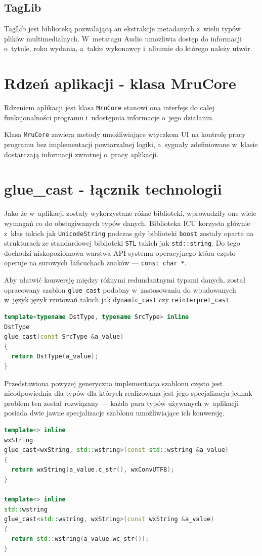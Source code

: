 \subsection{TagLib}
TagLib jest biblioteką pozwalającą an ekstrakcje metadanych z~wielu typów plików multimedialnych. W~metatagu Audio umożliwia dostęp do informacji o~tytule, roku wydania, a~także wykonawcy i~albumie do którego należy utwór.

\section{Rdzeń aplikacji - klasa MruCore}
Rdzeniem aplikacji jest klasa \texttt{MruCore} stanowi ona interfejs do całej funkcjonalności programu i~udostępnia informacje o~jego działaniu.
\par
Klasa \texttt{MruCore} zawiera metody umożliwiające wtyczkom UI na kontrolę pracy programu bez implementacji powtarzalnej logiki, a~sygnały zdefiniowane w~klasie dostarczają informacji zwrotnej o~pracy aplikacji.

\section{glue\_cast - łącznik technologii}
Jako że w~aplikacji zostały wykorzystane różne biblioteki, wprowadziły one wiele wymagań co do obsługiwanych typów danych.
Biblioteka ICU korzysta głównie z~klas takich jak \texttt{UnicodeString} podczas gdy biblioteki \texttt{boost} zostały oparte na strukturach ze standardowej biblioteki \texttt{STL} takich jak \texttt{std::string}. Do tego dochodzi niskopoziomowa warstwa API systemu operacyjnego która często operuje na surowych łańcuchach znaków --- \texttt{const char *}.
\par
Aby ułatwić konwersję między różnymi redundantnymi typami danych, został opracowany szablon \texttt{glue\_cast} podobny w~zastosowaniu do wbudowanych w~język język rzutowań takich jak \texttt{dynamic\_cast} czy \texttt{reinterpret\_cast}.

\begin{lstlisting}[caption={ glue.hpp}, language=C++]
template<typename DstType, typename SrcType> inline
DstType
glue_cast(const SrcType &a_value)
{
  return DstType(a_value);
}
\end{lstlisting}

\par
Przedstawiona powyżej generyczna implementacja szablonu często jest nieodpowiednia dla typów dla których realizowana jest jego specjalizacja jednak problem ten został rozwiązany --- każda para typów używanych w~aplikacji posiada dwie jawne specjalizacje szablonu umożliwiające ich konwersję.
\clearpage
\begin{lstlisting}[caption={ Fragment glue\_impl.hpp --- specjalizacja dla std::wstring i~wxString}, language=C++]
template<> inline
wxString
glue_cast<wxString, std::wstring>(const std::wstring &a_value)
{
  return wxString(a_value.c_str(), wxConvUTF8);
}

template<> inline
std::wstring
glue_cast<std::wstring, wxString>(const wxString &a_value)
{
  return std::wstring(a_value.wc_str());
}

\end{lstlisting}


